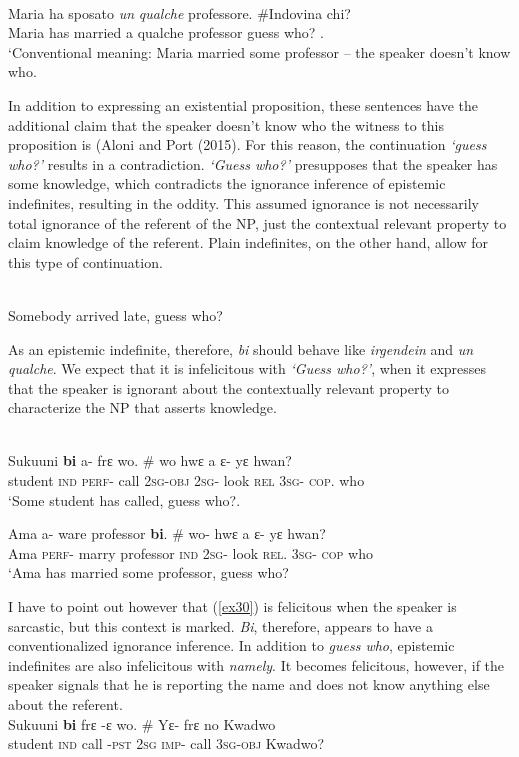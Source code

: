 \documentclass[output=paper,modfonts]{langsci/langscibook}
\begin{document}
\ex \label{ex28}\\
\gll Maria ha sposato \emph{un} \emph{qualche} professore. \#Indovina chi? \\
      Maria has married a qualche professor guess who? .\\
\glt `Conventional meaning: Maria married some professor – the speaker doesn’t know who.
\z 

In addition to expressing an existential proposition, these sentences have the additional claim that the speaker doesn't know who the witness to this proposition is (Aloni and Port (2015). For this reason, the continuation \emph{`guess who?'} results in a contradiction. \emph{`Guess who?'} presupposes that the speaker has some knowledge, which contradicts the ignorance inference of epistemic indefinites, resulting in the oddity.  This assumed ignorance is not necessarily total ignorance of the referent of the NP,  just the contextual relevant property to claim knowledge of the referent. Plain indefinites, on the other hand, allow for this type of continuation.

  \ea\label{ex26}\\
 Somebody arrived late, guess who?
 \z 
 
 As an epistemic indefinite, therefore, \emph{bi} should behave like \emph{irgendein} and \emph{un qualche}. We expect that it is infelicitous with \emph{`Guess who?'}, when it expresses that the speaker is ignorant about the contextually relevant property to characterize the NP that asserts knowledge.  


\ea {}\\
 \ea\label{ex30}
 \gll Sukuuni \textbf{bi} a- frε wo. \# wo hwε a ε- yε hwan? \\
     student \textsc{ind} \textsc{perf}- call       \textsc{2sg}-\textsc{obj} {} \textsc{2sg}- look  \textsc{rel} \textsc{3sg}- \textsc{cop}. who \\
\glt `Some student has called, guess who?.

\ex \label{ex31}
\gll  Ama a- ware professor \textbf{bi}. \# wo- hwε a ε- yε hwan?\\
Ama \textsc{perf}- marry professor \textsc{ind} {} \textsc{2sg}- look  \textsc{rel}. \textsc{3sg}- \textsc{cop} who\\
\glt `Ama has married some professor, guess who?
\z\z 

I have to point out however that (\ref{ex30}) is felicitous when the speaker is sarcastic, but this context is marked. \emph{Bi}, therefore, appears to have a conventionalized ignorance inference. In addition to \emph{guess who}, epistemic indefinites are also infelicitous with \emph{namely}. It becomes felicitous, however, if the speaker signals that he is reporting the name and does not know anything else about the referent. 
\ea {}\\
\ea\label{ex32}
 \gll Sukuuni \textbf{bi} frε -ε wo. \# Yε- frε no Kwadwo\\
student \textsc{ind} call -\textsc{pst}  \textsc{2sg} {} \textsc{imp}- call  3\textsc{sg}-\textsc{obj} Kwadwo? \\
    
\end{document}
